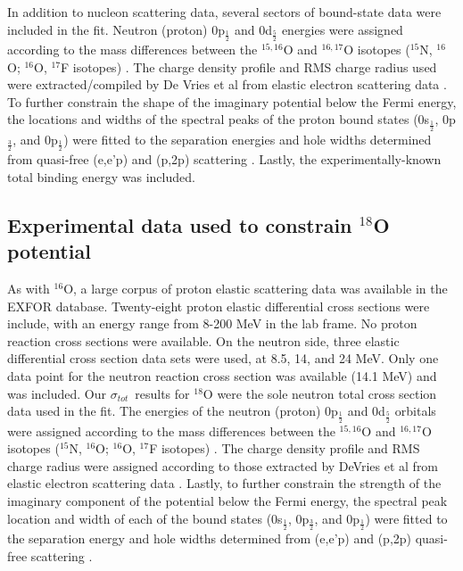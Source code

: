 \documentclass[twocolumn,secnumarabic,amssymb, nobibnotes, aps, prl,
superscriptaddress, nobalancelastpage]{revtex4}
\newcommand{\tot}{\ensuremath{\sigma_{tot}}}
\begin{document}
In addition to nucleon scattering data, several sectors of bound-state data were
included in the fit. Neutron (proton) 0p$_{\frac{1}{2}}$ and 0d$_{\frac{5}{2}}$ energies were
assigned according to the mass differences between the $^{15,16}$O and
$^{16,17}$O isotopes ($^{15}$N, $^{16}$O; $^{16}$O, $^{17}$F isotopes) \cite{AME2016}.
The charge density profile and RMS charge radius used were extracted/compiled by
De Vries et al from elastic electron scattering data
\cite{DeVries1987}. To further constrain the shape of the imaginary
potential below the Fermi energy, the locations and widths of the spectral peaks
of the proton bound states (0s$_\frac{1}{2}$, 0p$_\frac{3}{2}$, and
0p$_\frac{1}{2}$) were fitted to the separation energies and hole widths determined
from quasi-free (e,e'p) and (p,2p) scattering \cite{Mougey1980, Jacob1966,
Jacob1973}. Lastly, the experimentally-known total binding energy was included. 

\subsection{Experimental data used to constrain $^{18}$O potential}

As with $^{16}$O, a large corpus of proton elastic scattering data was
available in the EXFOR database. Twenty-eight proton elastic differential cross
sections were include, with an energy range from 8-200 MeV in the lab frame.
No proton reaction cross sections were available. On the neutron side, three
elastic differential cross section data sets were used, at 8.5, 14, and 24 MeV.
Only one data point for the neutron reaction cross section was available (14.1
MeV) and was included. Our \tot\ results for $^{18}$O were the
sole neutron total cross section data used in the fit. The energies of the
neutron (proton) 0p$_{\frac{1}{2}}$ and 0d$_{\frac{5}{2}}$ orbitals were
assigned according to the mass differences between the $^{15,16}$O and
$^{16,17}$O isotopes ($^{15}$N, $^{16}$O; $^{16}$O, $^{17}$F isotopes) \cite{AME2016}.
The charge density profile and RMS charge radius were assigned according to
those extracted by DeVries et al from elastic electron scattering data
\cite{DeVries1987}. Lastly, to further constrain the strength of the imaginary
component of the potential below the Fermi energy, the spectral peak location and
width of each of the bound states (0s$_\frac{1}{2}$, 0p$_\frac{3}{2}$, and
0p$_\frac{1}{2}$) were fitted to the separation energy and hole widths determined
from (e,e'p) and (p,2p) quasi-free scattering \cite{Mougey1980, Jacob1966,
Jacob1973}.
\end{document}
